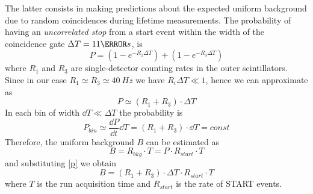 \indent The latter consists in making predictions about the expected uniform background due to random coincidences during lifetime measurements. %
The probability of having an \emph{uncorrelated stop} from a start event within the width of the coincidence gate $\Delta T  = \si{11}{\micro s}$, is
\begin{equation}
	P = (1 - e^{ - R_1 \Delta T}) + (1 - e^{ - R_3 \Delta T})
\end{equation}
where $R_1$ and $R_3$ are single-detector counting rates in the outer scintillators. Since in our case $R_1 \simeq R_3 \simeq \SI{40}{Hz}$ we have $R_i \Delta T \ll 1$, hence we can approximate as
\begin{equation}\label{p}
	P \simeq (R_1 + R_3 ) \cdot \Delta T
\end{equation}
In each bin of width $\dd T \ll \Delta T$ the probability is
\begin{equation}
	P_{bin} \simeq \frac{\dd P}{\dd t} \dd T = (R_1 + R_3 ) \cdot \dd T = const
\end{equation}
Therefore, the uniform background $B$ can be estimated as
\begin{equation}
	B = R_{bkg} \cdot T = P \cdot R_{start} \cdot T 
\end{equation}
and substituting \eqref{p} we obtain
\begin{equation}
	B = (R_1 + R_3 ) \cdot \Delta T \cdot R_{start} \cdot T 
\end{equation}
where $T$ is the run acquisition time and $R_{start}$ is the rate of START events.